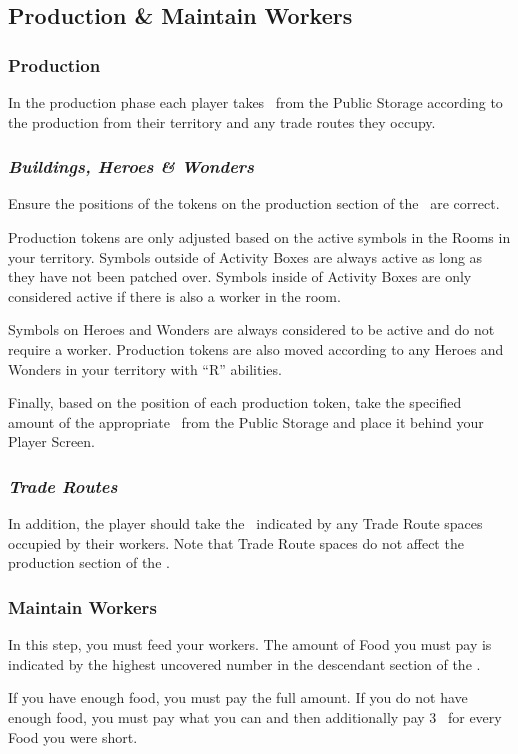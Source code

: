 \documentclass[10pt,twocolumn]{article}
\begin{document}
\subsection{Production \& Maintain Workers}
\subsubsection{Production}
In the production phase each player takes \goods\ from the Public Storage according to the production from their territory and any trade routes they occupy.

\subsubsection*{\textit{Buildings, Heroes \& Wonders}}
Ensure the positions of the tokens on the production section of the \psb\ are correct.

Production tokens are only adjusted based on the active symbols in the Rooms in your territory. Symbols outside of Activity Boxes are always active as long as they have not been patched over. Symbols inside of Activity Boxes are only considered active if there is also a worker in the room.

Symbols on Heroes and Wonders are always considered to be active and do not require a worker. Production tokens are also moved according to any Heroes and Wonders in your territory with ``R'' abilities.

Finally, based on the position of each production token, take the specified amount of the appropriate \good\ from the Public Storage and place it behind your Player Screen.

\subsubsection*{\textit{Trade Routes}}
In addition, the player should take the \goodss\ indicated by any Trade Route spaces occupied by their workers. Note that Trade Route spaces do not affect the production section of the \psb.

\subsubsection{Maintain Workers}
In this step, you must feed your workers. The amount of Food you must pay is indicated by the highest uncovered number in the descendant section of the \psb.

If you have enough food, you must pay the full amount. If you do not have enough food, you must pay what you can and then additionally pay 3 \vps\ for every Food you were short.
\end{document}
